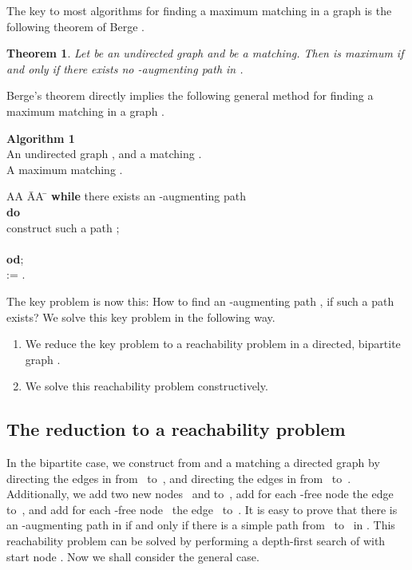 \documentclass[12pt,twoside,a4paper]{article}
\newtheorem{theo}{Theorem}
\begin{document}
The key to most algorithms for finding a maximum matching in a graph is the
following theorem of Berge \cite{Be}.

\begin{theo}
Let  be an undirected graph and  be a matching. Then
 is maximum if and only if there exists no -augmenting path in .
\end{theo}
Berge's theorem directly implies the following general method for
finding a maximum matching in a graph .


\medskip
\noindent
{\bf Algorithm 1} \\
 An undirected graph , and a matching
. \\
 A maximum matching . \\
\vspace{-0.3cm}
\begin{tabbing}
AA \= AA \= \kill
{\bf while} there exists an -augmenting path \\
\> {\bf do} \\
        \>  \> construct such a path ; \\
        \>  \>  \\
\> {\bf od}; \\
 := .
\end{tabbing}

The key problem is now this: How to find an -augmenting path , if such 
a path exists?
We solve this key problem in the following way.
\begin{enumerate}
\item We reduce the key problem to a reachability problem in a directed,
bipartite graph .
\item We solve this reachability problem constructively.
\end{enumerate}

\subsection{The reduction to a reachability problem}

In the bipartite case, we construct from  and a matching 
 a directed graph  by directing 
the edges in  from~ to~,
and directing the edges in  from ~to~. Additionally, we add
two new
nodes~ and  to~, add for each -free node  the edge
 to~, and add for each -free node~ the edge~
to~.
It is easy to prove that there is an -augmenting path in  if and
only if there is a simple path from~ to~ in .
This reachability problem can be solved by performing a depth-first search 
of  with start node . Now we shall consider the general case.
\end{document}
